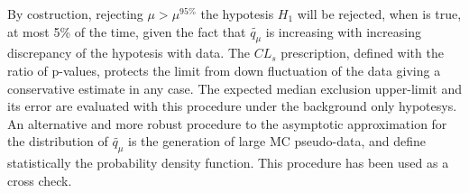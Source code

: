 By costruction, rejecting $\mu > \mu^{95\%}$ the hypotesis $H_1$ will be rejected, when is true, at most 5\% of the time,
given the fact that $\tilde{q_{\mu}}$ is increasing with increasing discrepancy of the hypotesis with data.
The $CL_{s}$ prescription, defined with the ratio of p-values, protects the limit from down fluctuation of the data
giving a conservative estimate in any case.
%
%	
%
The expected median exclusion upper-limit and its error are evaluated with this procedure under the background only hypotesys.
An alternative and more robust procedure to the  asymptotic approximation for the distribution of $\tilde{q_{\mu}}$ is 
the generation of large MC pseudo-data,  and define statistically the probability density function. This procedure has been
used as a cross check.

